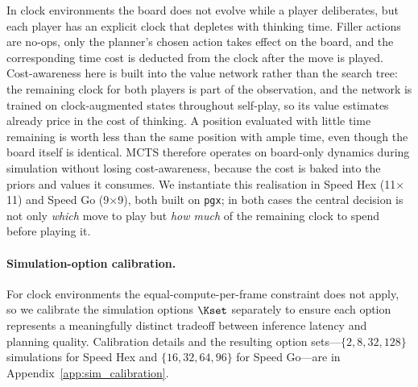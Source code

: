 In clock environments the board does not evolve while a player
deliberates, but each player has an explicit clock that depletes with
thinking time.
Filler actions are no-ops, only the planner's chosen action takes
effect on the board, and the corresponding time cost is deducted from
the clock after the move is played.
Cost-awareness here is built into the value network rather than the
search tree: the remaining clock for both players is part of the
observation, and the network is trained on clock-augmented states
throughout self-play, so its value estimates already price in the cost
of thinking.
A position evaluated with little time remaining is worth less than the
same position with ample time, even though the board itself is
identical.
MCTS therefore operates on board-only dynamics during simulation
without losing cost-awareness, because the cost is baked into the
priors and values it consumes.
We instantiate this realisation in Speed Hex (11$\times$11) and Speed
Go (9$\times$9), both built on \texttt{pgx}; in both cases the central
decision is not only \emph{which} move to play but \emph{how much} of
the remaining clock to spend before playing it.

\paragraph{Simulation-option calibration.}
For clock environments the equal-compute-per-frame constraint does not
apply, so we calibrate the simulation options $\Kset$ separately to
ensure each option represents a meaningfully distinct tradeoff between
inference latency and planning quality.
Calibration details and the resulting option sets---$\{2,8,32,128\}$
simulations for Speed Hex and $\{16,32,64,96\}$ for Speed Go---are in
Appendix~\ref{app:sim_calibration}.